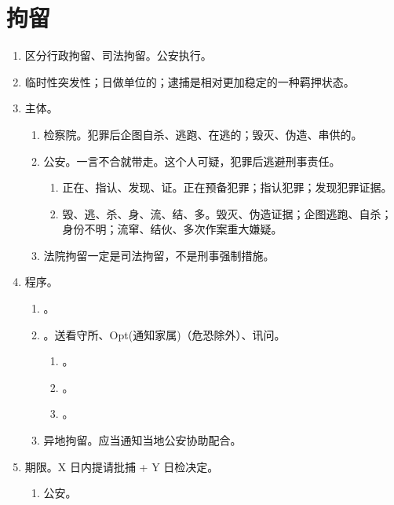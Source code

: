 \section{拘留}
\begin{enumerate}
  \item 区分行政拘留、司法拘留。公安执行。
  \item 临时性突发性；日做单位的；逮捕是相对更加稳定的一种羁押状态。
  \item 主体。
        \begin{enumerate}
          \item 检察院。犯罪后企图自杀、逃跑、在逃的；毁灭、伪造、串供的。
          \item 公安。一言不合就带走。这个人可疑，犯罪后逃避刑事责任。
                \begin{enumerate}
                  \item 正在、指认、发现、证。正在预备犯罪；指认犯罪；发现犯罪证据。
                  \item 毁、逃、杀、身、流、结、多。毁灭、伪造证据；企图逃跑、自杀；身份不明；流窜、结伙、多次作案重大嫌疑。
                \end{enumerate}
          \item 法院拘留一定是司法拘留，不是刑事强制措施。
        \end{enumerate}
  \item 程序。
        \begin{enumerate}
          \item {}。
          \item {}。送看守所、Opt(通知家属)（危恐除外）、讯问。
                \begin{enumerate}
                  \item {}。
                  \item {}。
                  \item {}。
                \end{enumerate}
          \item 异地拘留。应当通知当地公安协助配合。
        \end{enumerate}
  \item 期限。X 日内提请批捕 + Y 日检决定。
        \begin{enumerate}
          \item 公安。
                \begin{enumerate}

\end{enumerate}
\end{enumerate}
\end{enumerate}
